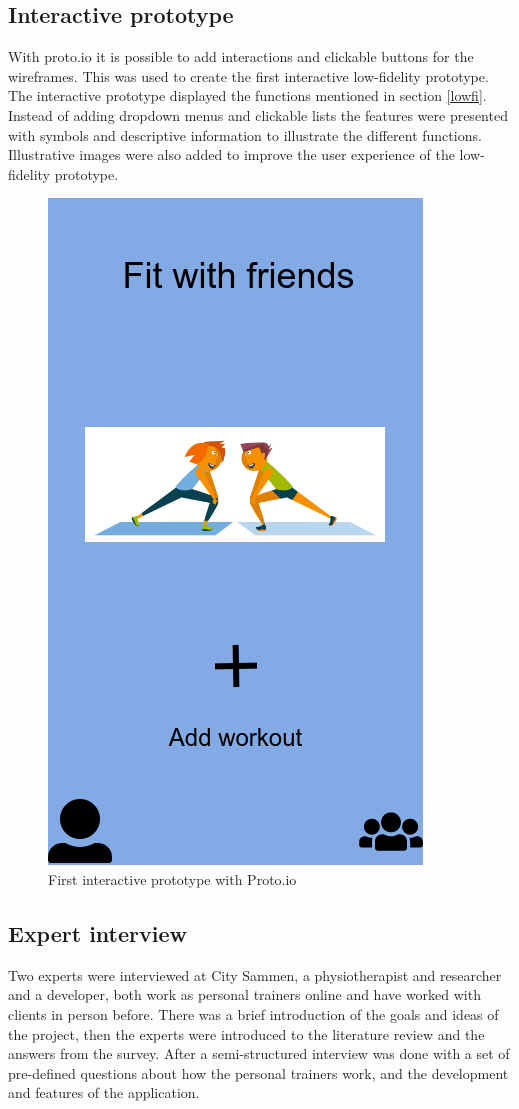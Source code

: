 \subsection{Interactive prototype}
With proto.io it is possible to add interactions and clickable buttons for the wireframes. This was used to create the first interactive low-fidelity prototype. The interactive prototype displayed the functions mentioned in section \ref{lowfi}. Instead of adding dropdown menus and clickable lists the features were presented with symbols and descriptive information to illustrate the different functions. Illustrative images were also added to improve the user experience of the low-fidelity prototype.
\begin{figure}[H]
    \centering
    \includegraphics[scale=0.25]{figures/777.png}
    \caption{First interactive prototype with Proto.io}
    \label{intProt}
\end{figure}
\subsection{Expert interview}
Two experts were interviewed at City Sammen, a physiotherapist and researcher and a developer, both work as personal trainers online and have worked with clients in person before. There was a brief introduction of the goals and ideas of the project, then the experts were introduced to the literature review and the answers from the survey. After a semi-structured interview was done with a set of pre-defined questions about how the personal trainers work, and the development and features of the application. 

